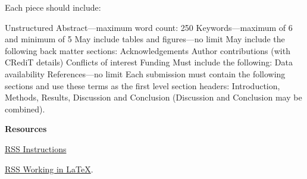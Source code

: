 \documentclass{article}
\begin{document}
Each piece should include:

Unstructured Abstract—maximum word count: 250
Keywords—maximum of 6 and minimum of 5
May include tables and figures—no limit
May include the following back matter sections:
Acknowledgements
Author contributions (with CRediT details)
Conflicts of interest
Funding
Must include the following:
Data availability
References—no limit
Each submission must contain the following sections and use these terms as the first
level section headers: Introduction, Methods, Results, Discussion and Conclusion
(Discussion and Conclusion may be combined).

{\bf Resources}

\href{https://academic.oup.com/rssdat/pages/general-instructions}{RSS Instructions} 

\href{https://academic.oup.com/pages/authoring/books/preparing-your-manuscript/working-in-latex}{RSS Working in \LaTeX}.


\end{document}
